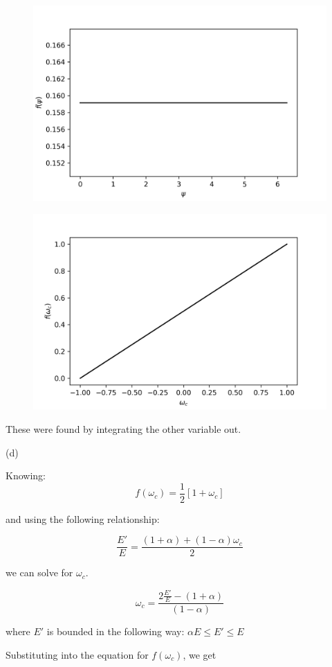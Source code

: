 \documentclass{amsart}
\theoremstyle{definition}
\begin{document}
\begin{figure}[h!]
\includegraphics[width=0.6\linewidth]{p1_1.png}
\end{figure}


\begin{figure}[h!]
\includegraphics[width=0.6\linewidth]{p1_2.png}
\end{figure}

These were found by integrating the other variable out.

\vspace{0.2\textheight}
(d)

Knowing:
$$ f(\omega_c) = \frac{1}{2} [1 + \omega_c] $$

and using the following relationship:

$$ \frac{E'}{E} = \frac{(1 + \alpha) + (1 - \alpha) \omega_c}{2} $$

we can solve for $\omega_c$.

$$ \omega_c = \frac{2\frac{E'}{E} - (1 + \alpha)}{(1 - \alpha)} $$

where $E'$ is bounded in the following way: $\alpha E \le E' \le E$

Substituting into the equation for $f(\omega_c)$, we get

\end{document}

